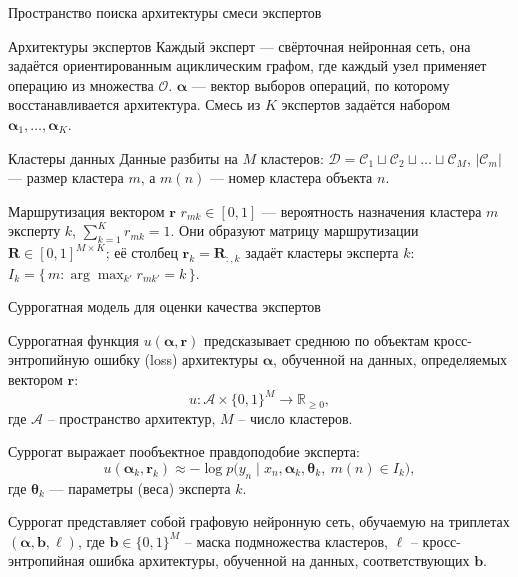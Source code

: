 \documentclass{beamer}
\begin{document}
\begin{frame}{Пространство поиска архитектуры смеси экспертов}

    \begin{block}{Архитектуры экспертов}
        Каждый эксперт --- свёрточная нейронная сеть, она задаётся ориентированным ациклическим графом, где каждый узел применяет операцию из множества $\mathcal{O}$. $\boldsymbol{\alpha}$ --- вектор выборов операций, по которому восстанавливается архитектура. Смесь из $K$ экспертов задаётся набором $\boldsymbol{\alpha}_1, \dots, \boldsymbol{\alpha}_K$.
    \end{block}

    \begin{block}{Кластеры данных}
        Данные разбиты на $M$ кластеров: $\mathcal{D} = \mathcal{C}_1 \sqcup \mathcal{C}_2 \sqcup \dots \sqcup \mathcal{C}_M$, $|\mathcal{C}_m|$ --- размер кластера $m$, а $m(n)$ --- номер кластера объекта $n$.
    \end{block}

    \begin{block}{Маршрутизация вектором $\mathbf{r}$}
        $r_{mk} \in [0,1]$ --- вероятность назначения кластера $m$ эксперту $k$, $\sum_{k=1}^{K} r_{mk} = 1$. Они образуют матрицу маршрутизации $\mathbf{R} \in [0,1]^{M \times K}$; её столбец $\mathbf{r}_k = \mathbf{R}_{:,k}$ задаёт кластеры эксперта $k$: $I_k = \{\, m : \arg\max_{k'} r_{mk'} = k \,\}$.
    \end{block}

\end{frame}
\begin{frame}{Суррогатная модель для оценки качества экспертов}

    Суррогатная функция $u(\boldsymbol{\alpha}, \mathbf{r})$ предсказывает среднюю по объектам кросс-энтропийную ошибку (loss) архитектуры $\boldsymbol{\alpha}$, обученной на данных, определяемых вектором $\mathbf{r}$:
    $$u: \mathcal{A} \times \{0,1\}^M \to \mathbb{R}_{\geq 0},$$
    где $\mathcal{A}$ -- пространство архитектур, $M$ -- число кластеров.

    \medskip

    Суррогат выражает пообъектное правдоподобие эксперта:
    $$u(\boldsymbol{\alpha}_k, \mathbf{r}_k) \approx -\log p\bigl(y_n \mid x_n, \boldsymbol{\alpha}_k, \boldsymbol{\theta}_k,\ m(n) \in I_k\bigr),$$
    где $\boldsymbol{\theta}_k$ --- параметры (веса) эксперта $k$.

    \bigskip

    Суррогат представляет собой графовую нейронную сеть, обучаемую на триплетах $(\boldsymbol{\alpha}, \mathbf{b}, \ell)$, где $\mathbf{b} \in \{0,1\}^M$ -- маска подмножества кластеров, $\ell$ -- кросс-энтропийная ошибка архитектуры, обученной на данных, соответствующих $\mathbf{b}$.

\end{frame}
\end{document}
